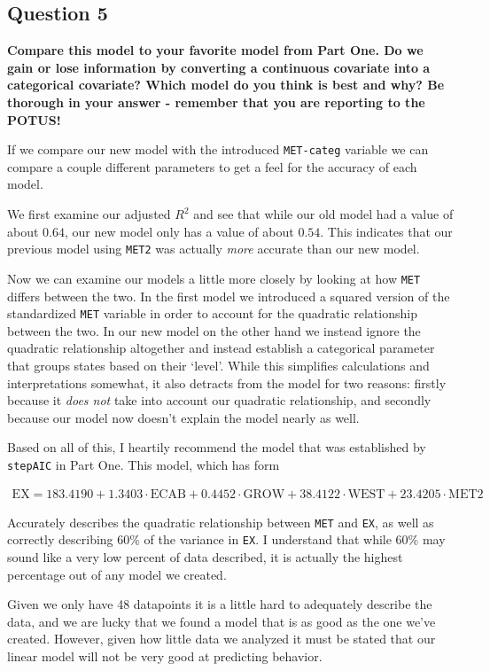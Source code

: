 \documentclass{article}
\begin{document}
    \subsection{Question 5}


    \textbf{Compare this model to your favorite model from Part One. Do we
gain or lose information by converting a continuous covariate into a
categorical covariate? Which model do you think is best and why? Be
thorough in your answer - remember that you are reporting to the POTUS!}

If we compare our new model with the introduced \texttt{MET-categ}
variable we can compare a couple different parameters to get a feel for
the accuracy of each model.

We first examine our adjusted $R^2$ and see that while our old model had
a value of about $0.64$, our new model only has a value of about $0.54$.
This indicates that our previous model using \texttt{MET2} was actually
\emph{more} accurate than our new model.

Now we can examine our models a little more closely by looking at how
\texttt{MET} differs between the two. In the first model we introduced a
squared version of the standardized \texttt{MET} variable in order to
account for the quadratic relationship between the two. In our new model
on the other hand we instead ignore the quadratic relationship
altogether and instead establish a categorical parameter that groups
states based on their `level'. While this simplifies calculations and
interpretations somewhat, it also detracts from the model for two
reasons: firstly because it \emph{does not} take into account our
quadratic relationship, and secondly because our model now doesn't
explain the model nearly as well.

Based on all of this, I heartily recommend the model that was
established by \texttt{stepAIC} in Part One. This model, which has form

\begin{equation}
\begin{aligned}
    \text{EX} = 183.4190 + 1.3403 \cdot \text{ECAB} +
                0.4452 \cdot \text{GROW} + 38.4122 \cdot \text{WEST} +
                23.4205 \cdot \text{MET2}
\end{aligned}
\end{equation}

Accurately describes the quadratic relationship between \texttt{MET} and
\texttt{EX}, as well as correctly describing 60\% of the variance in
\texttt{EX}. I understand that while 60\% may sound like a very low
percent of data described, it is actually the highest percentage out of
any model we created.

Given we only have 48 datapoints it is a little hard to adequately
describe the data, and we are lucky that we found a model that is as
good as the one we've created. However, given how little data we
analyzed it must be stated that our linear model will not be very good
at predicting behavior.


    
    
    
    
\end{document}
